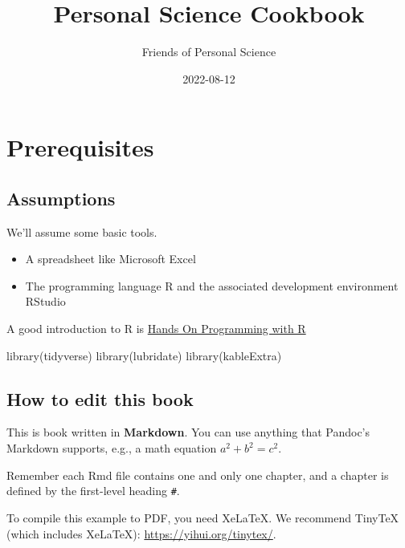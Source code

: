 \documentclass[
]{book}
\title{Personal Science Cookbook}
\author{Friends of Personal Science}
\date{2022-08-12}
\newenvironment{Shaded}{\begin{snugshade}}{\end{snugshade}}
\newcommand{\FunctionTok}[1]{\textcolor[rgb]{0.00,0.00,0.00}{#1}}
\newcommand{\NormalTok}[1]{#1}
\providecommand{\tightlist}{%
  \setlength{\itemsep}{0pt}\setlength{\parskip}{0pt}}
\begin{document}
\maketitle

{
\setcounter{tocdepth}{1}
\tableofcontents
}
\hypertarget{prerequisites}{%
\chapter{Prerequisites}\label{prerequisites}}

\hypertarget{assumptions}{%
\section{Assumptions}\label{assumptions}}

We'll assume some basic tools.

\begin{itemize}
\tightlist
\item
  A spreadsheet like Microsoft Excel
\item
  The programming language R and the associated development environment RStudio
\end{itemize}

A good introduction to R is \href{https://rstudio-education.github.io/hopr/}{Hands On Programming with R}

\begin{Shaded}
\begin{Highlighting}[]
\FunctionTok{library}\NormalTok{(tidyverse)}
\FunctionTok{library}\NormalTok{(lubridate)}
\FunctionTok{library}\NormalTok{(kableExtra)}
\end{Highlighting}
\end{Shaded}

\hypertarget{how-to-edit-this-book}{%
\section{How to edit this book}\label{how-to-edit-this-book}}

This is book written in \textbf{Markdown}. You can use anything that Pandoc's Markdown supports, e.g., a math equation \(a^2 + b^2 = c^2\).

Remember each Rmd file contains one and only one chapter, and a chapter is defined by the first-level heading \texttt{\#}.

To compile this example to PDF, you need XeLaTeX. We recommend TinyTeX (which includes XeLaTeX): \url{https://yihui.org/tinytex/}.
\end{document}
